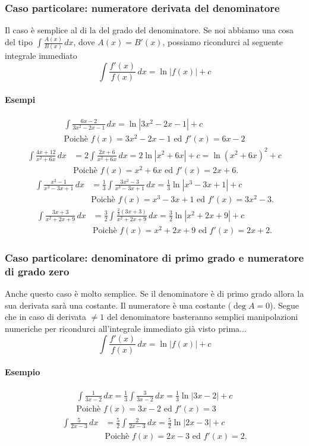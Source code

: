 \documentclass[11pt]{article}
\begin{document}
\subsubsection{Caso particolare: numeratore derivata del denominatore}
Il caso è semplice al di la del grado del denominatore. Se noi abbiamo una cosa del tipo $\int\frac{A(x)}{B(x)}\,dx$, dove $A(x)=B'(x)$, possiamo ricondurci al seguente integrale immediato
\[\int\frac{f'(x)}{f(x)}\,dx=\ln|f(x)|+c\]
\paragraph{Esempi}
\begin{align*} \int \frac{6x-2}{3x^2-2x-1}\,dx=\ln | 3x^2-2x-1|+c\\\text{Poichè $f(x)=3x^2-2x-1$ ed $f'(x)=6x-2$}\end{align*}
\begin{align*}\int\frac{4x+12}{x^2+6x}\,dx&=2\int \frac{2x+6}{x^2+6x}\,dx=2\ln |x^2+6x|+c=\ln(x^2+6x)^2+c\\&\text{Poichè $f(x)=x^2+6x$ ed $f'(x)=2x+6$.}\end{align*}
\begin{align*}\int \frac{x^2-1}{x^3-3x+1}\,dx&=\frac{1}{3}\int \frac{3x^2-3}{x^3-3x+1}\,dx=\frac{1}{3}\ln|x^3-3x+1|+c\\&\text{Poichè $f(x)=x^3-3x+1$ ed $f'(x)=3x^2-3$.}\end{align*}
\begin{align*}\int \frac{3x+3}{x^2+2x+9}\,dx&=\frac{3}{2}\int \frac{\frac{2}{3}(3x+3)}{x^2+2x+9}\,dx=\frac{3}{2}\ln|x^2+2x+9|+c\\&\text{Poichè $f(x)=x^2+2x+9$ ed $f'(x)=2x+2$.} \end{align*}
\subsubsection{Caso particolare: denominatore di primo grado e numeratore di grado zero}
Anche questo caso è molto semplice. Se il denominatore è di primo grado allora la sua derivata sarà una costante. Il numeratore è una costante ($\deg A =0$). Segue che in caso di derivata $\neq 1$ del denominatore  basteranno semplici manipolazioni numeriche per ricondurci all'integrale immediato già visto prima...
\[\int\frac{f'(x)}{f(x)}\,dx=\ln|f(x)|+c\]
\paragraph{Esempio}
\begin{align*}\int \frac{1}{3x-2}\,dx=\frac{1}{3}\int \frac{3}{3x-2}\,dx=\frac{1}{3}\ln|3x-2|+c\\\text{Poichè $f(x)=3x-2$ ed $f'(x)=3$}\end{align*}
\begin{align*}\int \frac{5}{2x-3}\,dx&=\frac{5}{2}\int \frac{2}{2x-3}\,dx=\frac{5}{2} \ln|2x-3|+c\\&\text{Poichè $f(x)=2x-3$ ed $f'(x)=2$.}\end{align*}
\end{document}
